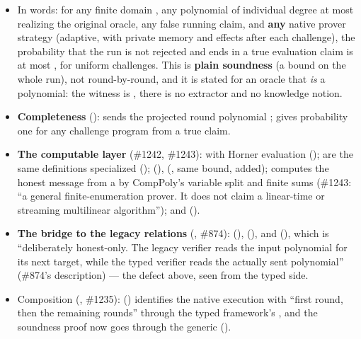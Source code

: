 \begin{itemize}
\item[] In words: for any finite domain , any polynomial  of individual degree at
  most  realizing the original oracle, any false running claim, and \textbf{any} native
  prover strategy (adaptive, with private memory and effects after each challenge), the
  probability that the run is not rejected and ends in a true evaluation claim is at most
  , for uniform challenges. This is \textbf{plain soundness} (a bound on
  the whole run), not round-by-round, and it is stated for an oracle that \emph{is} a polynomial:
  the witness is , there is no extractor and no knowledge notion.
\item \textbf{Completeness} ():
   sends the projected round polynomial
  ;  gives
  probability one for any  challenge program from a true claim.
\item \textbf{The computable layer} (\#1242, \#1243): 
   with Horner evaluation
  ();  are the same 
  definitions specialized (); 
  (),  (, same
  bound, \code{[BEq F] [LawfulBEq F]} added); 
   computes the honest message from a  by
  CompPoly's variable split and finite sums (\#1243: ``a general finite-enumeration prover. It
  does not claim a linear-time or streaming multilinear algorithm'');
   and 
  ().
\item \textbf{The bridge to the legacy relations} (, \#874):
   (),  (), and
   (), which is ``deliberately
  honest-only. The legacy verifier reads the input polynomial for its next target, while the
  typed verifier reads the actually sent polynomial'' (\#874's description) --- the defect above,
  seen from the typed side.
\item Composition (, \#1235): 
  () identifies the native execution with ``first round, then the remaining rounds''
  through the typed framework's , and the soundness proof now goes
  through the generic 
  ().
\end{itemize}

